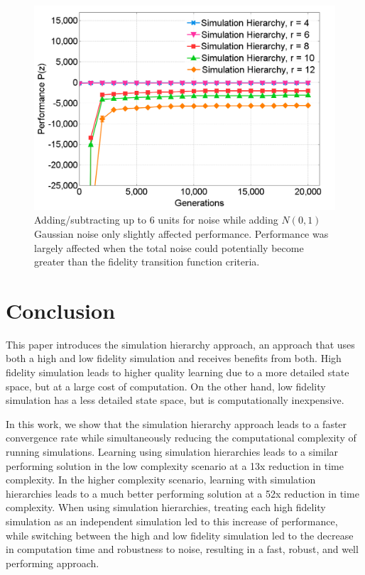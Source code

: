 \documentclass{aamas2014}
\begin{document}
\begin{figure}
\centering
\includegraphics[width=.75\columnwidth]{NoiseNew}
\caption{Adding/subtracting up to 6 units for noise while adding $N(0,1)$ Gaussian noise only slightly affected performance. Performance was largely affected when the total noise could potentially become greater than the fidelity transition function criteria. }
\label{fig:NoiseAllRuns}
\end{figure} 

\section{Conclusion}
This paper introduces the simulation hierarchy approach, an approach that uses both a high and low fidelity simulation and receives benefits from both. High fidelity simulation leads to higher quality learning due to a more detailed state space, but at a large cost of computation. On the other hand, low fidelity simulation has a less detailed state space, but is computationally inexpensive.

In this work, we show that the simulation hierarchy approach leads to a faster convergence rate while simultaneously reducing the computational complexity of running simulations. Learning using simulation hierarchies leads to a similar performing solution in the low complexity scenario at a 13x reduction in time complexity. In the higher complexity scenario, learning with simulation hierarchies leads to a much better performing solution at a 52x reduction in time complexity. When using simulation hierarchies, treating each high fidelity simulation as an independent simulation led to this increase of performance, while switching between the high and low fidelity simulation led to the decrease in computation time and robustness to noise, resulting in a fast, robust, and well performing approach.

\label{sec:CONCLUSION}




\end{document}
